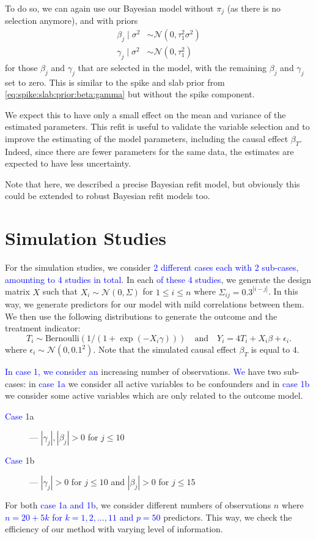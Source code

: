 \documentclass[preprint,12pt]{elsarticle}
\newcommand{\added}[1]{\textcolor{blue}{#1}}
\begin{document}
To do so, we can again use our Bayesian model without $\pi_j$ (as there is no selection anymore), and with priors
\begin{align}
\beta_j\mid\sigma^2&\sim\mathcal{N}(0,\tau_1^2\sigma^2) \\
\gamma_j\mid\sigma^2&\sim\mathcal{N}(0,\tau_1^2)
\end{align}
for those $\beta_j$ and $\gamma_j$ that are selected in the model, with the remaining $\beta_j$ and $\gamma_j$ set to zero.
This is similar to the spike and slab prior from \cref{eq:spike:slab:prior:beta:gamma} but without the spike component.

We expect this to have only a small effect on the mean and variance of the estimated parameters. This refit is useful to validate the variable selection and to improve the estimating of the model parameters, including the causal effect $\beta_T$. Indeed, since there are fewer parameters for the same data, the estimates are expected to have less uncertainty.

Note that here, we described a precise Bayesian refit model, but obviously this could be extended to robust Bayesian refit models too.

\section{Simulation Studies}\label{sec:sim}

For the simulation studies, we consider \added{2 different cases each with 2 sub-cases, amounting to 4 studies in total}. In each
\added{of these 4 studies}, we generate the design matrix $X$ such that $X_i\sim\mathcal{N}(0, \Sigma)$
for $1\le i\le n$ where $\Sigma_{ij} = 0.3^{|i-j|}$. In this way, we 
generate predictors for our model with mild correlations between them.
We then use the following distributions to generate the outcome and
the treatment indicator: 
\begin{equation}
    T_i \sim \text{Bernoulli}\left(1/(1+\exp(-X_i\gamma))\right)
    \quad\text{and}\quad
    Y_i = 4T_i + X_i\beta + \epsilon_i.
\end{equation}
where $\epsilon_i\sim\mathcal{N}(0,0.1^2)$.
Note that the simulated causal effect $\beta_T$ is equal to $4$.

\added{In case 1, we consider an} increasing number of observations. \added{We} have two
sub-cases: in \added{case 1a} we consider all active variables to be confounders
and in \added{case 1b} we consider some active variables which are only related to
the outcome model. 
\begin{description}
    \item[\added{Case} 1a] --- $|\gamma_j|, |\beta_j|>0$ for $j\le 10$
    \item[\added{Case} 1b] --- $|\gamma_j|>0$ for $j\le 10$ and $|\beta_j|>0$ for $j\le 15$
\end{description}
For both \added{case 1a and 1b}, we consider different numbers of observations $n$ where
\added{$n=20+ 5k$ for $k=1,2,\dots,11$ and $p=50$}
predictors. This way, we check the efficiency of our method with varying level of information.
\end{document}
